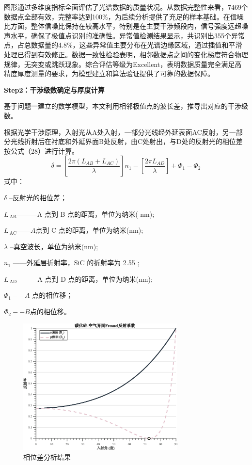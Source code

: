 \documentclass[withoutpreface,bwprint]{cumcmthesis}
\begin{document}
图形通过多维度指标全面评估了光谱数据的质量状况。从数据完整性来看，7469个数据点全部有效，完整率达到100\%，为后续分析提供了充足的样本基础。在信噪比方面，整体信噪比保持在较高水平，特别是在主要干涉频段内，信号强度远超噪声水平，确保了极值点识别的准确性。异常值检测结果显示，共识别出355个异常点，占总数据量的4.8\%，这些异常值主要分布在光谱边缘区域，通过插值和平滑处理已得到有效修正。数据一致性检验表明，相邻数据点之间的变化梯度符合物理规律，无突变或跳跃现象。综合评估等级为Excellent，表明数据质量完全满足高精度厚度测量的要求，为模型建立和算法验证提供了可靠的数据保障。

\textbf{Step2：干涉级数确定与厚度计算}

基于问题一建立的数学模型，本文利用相邻极值点的波长差，推导出对应的干涉级数。

根据光学干涉原理，入射光从A处入射，一部分光线经外延表面AC反射，另一部分光线折射后在衬底和外延界面B处反射，由C处射出，与D处的反射光的相位差按公式（28）进行计算。
\begin{equation}\delta=\left[\frac{2\pi(L_{AB}+L_{AC})}{\lambda}\right]n_{1}-\left[\frac{2\pi L_{AD}}{\lambda}\right]+\Phi_{1}-\Phi_{2}\end{equation}
式中：

$\delta$ --反射光的相位差；

$L_{\mathrm{~AB}}$———A 点到 B 点的距离，单位为纳米( nm);

$L_{\mathrm{~AC}}——A$点到 C 点的距离，单位为纳米(nm);

$\lambda$ --真空波长，单位为纳米(nm);

$n_1$ ——外延层折射率，SiC 的折射率为 2.55 ;

$L_{\mathrm{~AD}}$———A 点到 D 点的距离，单位为纳米(nm);

$\Phi_1--A$ 点的相位移；

$\Phi_{2}--B$点的相位移。
\begin{figure}[H]
\centering
\includegraphics[width=0.75\textwidth]{figures/phase_difference_analysis.eps}
\caption{相位差分析结果}
\label{fig:相位差分析结果}
\end{figure}
\end{document}
